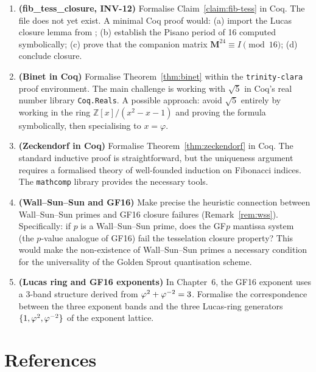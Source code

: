 \begin{enumerate}

\item \textbf{(fib\_tess\_closure, INV-12)}  Formalise
Claim~\ref{claim:fib-tess} in Coq.  The file
 does not yet exist.  A minimal
Coq proof would: (a) import the Lucas closure lemma from
; (b) establish the Pisano period of 16
computed symbolically; (c) prove that the companion matrix
\(\mathbf{M}^{24} \equiv I \pmod{16}\); (d) conclude closure.

\item \textbf{(Binet in Coq)}  Formalise Theorem~\ref{thm:binet} within
the \texttt{trinity-clara} proof environment.  The main challenge is
working with \(\sqrt{5}\) in Coq's real number library \texttt{Coq.Reals}.
A possible approach: avoid \(\sqrt{5}\) entirely by working in the ring
\(\mathbb{Z}[x]/(x^2-x-1)\) and proving the formula symbolically, then
specialising to \(x = \varphi\).

\item \textbf{(Zeckendorf in Coq)}  Formalise Theorem~\ref{thm:zeckendorf}
in Coq.  The standard inductive proof is straightforward, but the
uniqueness argument requires a formalised theory of well-founded induction
on Fibonacci indices.  The \texttt{mathcomp} library provides the necessary
tools.

\item \textbf{(Wall--Sun--Sun and GF16)}  Make precise the heuristic
connection between Wall--Sun--Sun primes and GF16 closure failures
(Remark~\ref{rem:wss}).  Specifically: if \(p\) is a Wall--Sun--Sun prime,
does the GF\(p\) mantissa system (the \(p\)-value analogue of GF16) fail
the tesselation closure property?  This would make the non-existence of
Wall--Sun--Sun primes a necessary condition for the universality of the
Golden Sprout quantisation scheme.

\item \textbf{(Lucas ring and GF16 exponents)}  In Chapter~6, the GF16
exponent uses a 3-band structure derived from
\(\varphi^{2}+\varphi^{-2}=3\).  Formalise the correspondence between
the three exponent bands and the three Lucas-ring generators
\(\{1, \varphi^{2}, \varphi^{-2}\}\) of the exponent lattice.

\end{enumerate}

\section{References}\label{sec:ch7-refs}

